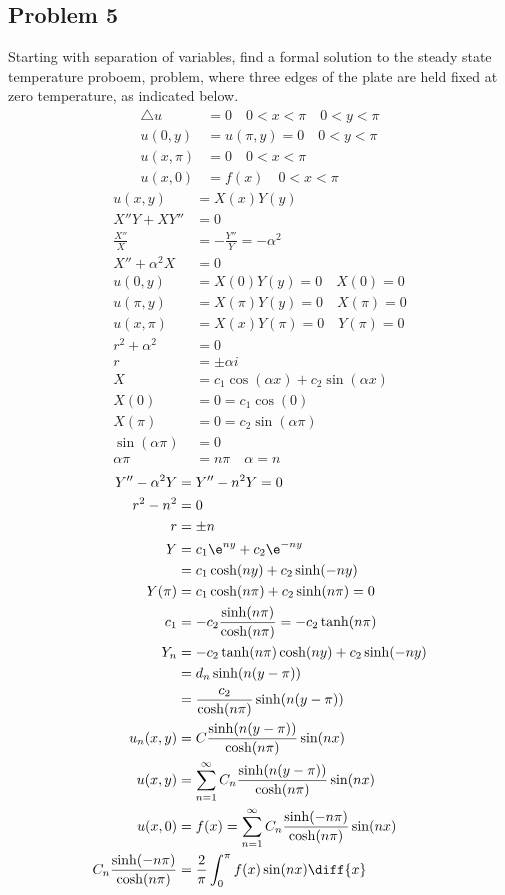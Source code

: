 \documentclass{math}
\begin{document}
\subsection*{Problem 5}
Starting with separation of variables, find a formal solution to the steady
state temperature proboem, problem, where three edges of the plate are held
fixed at zero temperature, as indicated below.
\begin{align*}
  \triangle u &= 0 \quad 0<x<\pi \quad 0<y<\pi \\
  u(0,y) &= u(\pi,y) = 0 \quad 0<y<\pi \\
  u(x,\pi) &= 0 \quad 0<x<\pi \\
  u(x,0) &= f(x) \quad 0<x<\pi
\end{align*}
\begin{align*}
  u(x,y) &= X(x)Y(y) \\
  X''Y+XY'' &= 0 \\
  \frac{X''}{X} &= -\frac{Y''}{Y} = -\alpha^2 \\
  X''+\alpha^2X &= 0 \\
  u(0,y) &= X(0)Y(y) = 0 \quad X(0) = 0 \\
  u(\pi,y) &= X(\pi)Y(y) = 0 \quad X(\pi) = 0 \\
  u(x,\pi) &= X(x)Y(\pi) = 0 \quad Y(\pi) = 0 \\
  r^2+\alpha^2 &= 0 \\
  r &= \pm\alpha i \\
  X &= c_1\cos(\alpha x)+c_2\sin(\alpha x) \\
  X(0) &= 0 = c_1\cos(0) \\
  X(\pi) &= 0 = c_2\sin(\alpha\pi) \\
  \sin(\alpha\pi) &= 0 \\
  \alpha\pi &= n\pi \quad \alpha = n
\end{align*}
\begin{align*}
  Y''-\alpha^2Y &= Y''-n^2Y = 0 \\
  r^2-n^2 &= 0 \\
  r &= \pm n \\
  Y &= c_1\e^{ny}+c_2\e^{-ny} \\
  &= c_1\cosh(ny)+c_2\sinh(-ny) \\
  Y(\pi) &= c_1\cosh(n\pi)+c_2\sinh(n\pi) = 0 \\
  c_1 &= -c_2\frac{\sinh(n\pi)}{\cosh(n\pi)} = -c_2\tanh(n\pi) \\
  Y_n &= -c_2\tanh(n\pi)\cosh(ny)+c_2\sinh(-ny) \\
  &= d_n\sinh(n(y-\pi)) \\
  &= \frac{c_2}{\cosh(n\pi)}\sinh(n(y-\pi)) \\
  u_n(x,y) &= C\frac{\sinh(n(y-\pi))}{\cosh(n\pi)}\sin(nx) \\
  u(x,y) &= \sum_{n=1}^{\infty}C_n
    \frac{\sinh(n(y-\pi))}{\cosh(n\pi)}\sin(nx) \\
  u(x,0) &= f(x) =
    \sum_{n=1}^{\infty}C_n\frac{\sinh(-n\pi)}{\cosh(n\pi)}\sin(nx) \\
  C_n\frac{\sinh(-n\pi)}{\cosh(n\pi)} &=
    \frac{2}{\pi}\int_{0}^{\pi}f(x)\sin(nx)\diff{x}
\end{align*}
\end{document}
